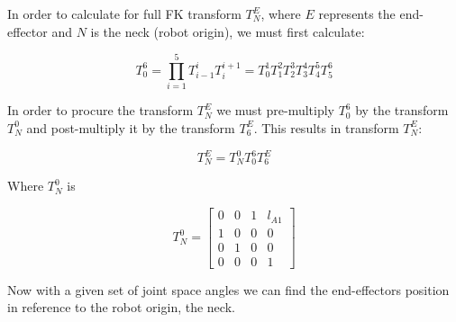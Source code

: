 In order to calculate for full FK transform $T_{N}^{E}$, where $E$ represents the end-effector and $N$ is the neck (robot origin), we must first calculate:

\begin{equation}\label{eq:t06}
T_0^6 = \prod_{i=1}^{5} T_{i-1}^{i} T_{i}^{i+1} = T_{0}^{1}T_{1}^{2}T_{2}^{3}T_{3}^{4}T_{4}^{5}T_{5}^{6}
\end{equation}

In order to procure the transform $T_{N}^{E}$ we must pre-multiply $T_{0}^{6}$ by the transform $T_{N}^{0}$ and post-multiply it by the transform $T_{6}^{E}$.  
This results in transform $T_{N}^{E}$:

\begin{equation}
T_{N}^{E} = T_{N}^{0}T_{0}^{6}T_{6}^{E}
\end{equation}

Where $T_{N}^{0}$ is

\begin{equation}
T_{N}^{0} = \left[ \begin{array}{cccc} 
0 & 0 & 1 &  l_{A1} \\ 
1 & 0 & 0 &  0        \\
0 & 1 & 0 &  0        \\
0 & 0 & 0 &  1                 
\end{array} \right]
\end{equation} 


Now with a given set of joint space angles we can find the end-effectors position in reference to the robot origin, the neck.
